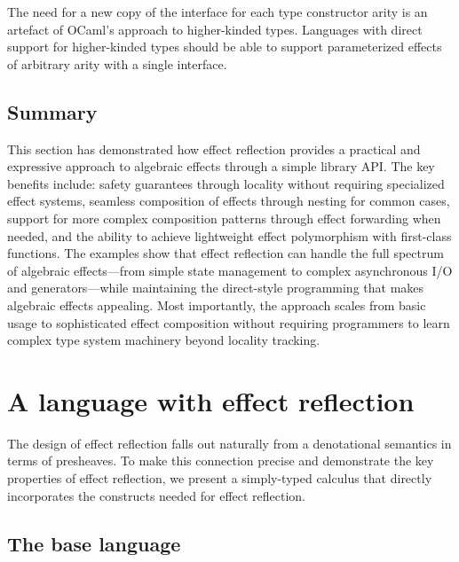 \documentclass[acmsmall, screen, review, anonymous]{acmart}
\theoremstyle{definition}
\begin{document}
The need for a new copy of the interface for each type constructor arity
is an artefact of OCaml's approach to higher-kinded types. Languages
with direct support for higher-kinded types should be able to support
parameterized effects of arbitrary arity with a single interface.

\subsection{Summary}

This section has demonstrated how effect reflection provides a practical
and expressive approach to algebraic effects through a simple library
API. The key benefits include: safety guarantees through locality
without requiring specialized effect systems, seamless composition of
effects through nesting for common cases, support for more complex
composition patterns through effect forwarding when needed, and the
ability to achieve lightweight effect polymorphism with first-class
functions. The examples show that effect reflection can handle the full
spectrum of algebraic effects—from simple state management to complex
asynchronous I/O and generators—while maintaining the direct-style
programming that makes algebraic effects appealing. Most importantly,
the approach scales from basic usage to sophisticated effect composition
without requiring programmers to learn complex type system machinery
beyond locality tracking.

\section{A language with effect reflection}
\label{sec:language}

The design of effect reflection falls out naturally from a denotational
semantics in terms of presheaves. To make this connection precise and
demonstrate the key properties of effect reflection, we present a
simply-typed calculus that directly incorporates the constructs needed
for effect reflection.

\subsection{The base language}
\end{document}
